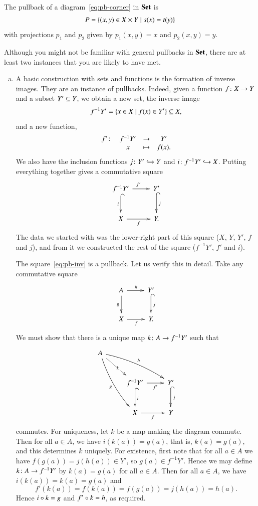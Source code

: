 \begin{examples}
\label{egs:pb-sets}
The pullback of a diagram~\eqref{eq:pb-corner} in $\mathbf{Set}$ is
\[
P = \{ (x, y) \in X \times Y \mathrel{|} s(x) = t(y) \}
\]
with projections $p_1$ and $p_2$ given by $p_1(x, y) = x$ and $p_2(x, y) =
y$.

Although you might not be familiar with general pullbacks in $\mathbf{Set}$, there are
at least two instances that you are likely to have met.
%
\begin{enumerate}[(b)]
\item
\label{eg:pb-sets-inv}
A basic construction with sets and functions is the formation of inverse%
%
%
images.  They are an instance of pullbacks.  Indeed, given a function
$f\from X \to Y$ and a subset $Y' \subseteq Y$, we obtain a new set, the inverse
image
\[
f^{-1}Y'
=
\{ x \in X \mathrel{|} f(x) \in Y' \} \subseteq X,
\]
and a new function,
\[
\begin{array}{cccc}
f'\from         &f^{-1} Y'      &\to            &Y'     \\
                &x              &\mapsto        &f(x).
\end{array}
\]
We also have the inclusion functions $j\from Y' \incl Y$ and $i\from f^{-1}Y'
\incl X$.  Putting everything together gives a commutative square
%
\begin{equation}
\label{eq:pb-inv}
\begin{array}{c}
\xymatrix@M+.5ex{
f^{-1}Y' \ar[r]^{f'} \ar@{^{(}->}[d]_i &
Y' \ar@{^{(}->}[d]^j   \\
X \ar[r]_f      &
Y.
}
\end{array}
\end{equation}
%
The data we started with was the lower-right part of this square ($X$, $Y$,
$Y'$, $f$ and $j$), and from it we constructed the rest of the square
($f^{-1} Y'$, $f'$ and $i$).

The square~\eqref{eq:pb-inv} is a pullback.  Let us verify this in detail.
Take any commutative square
\[
\xymatrix@M+.5ex{
A \ar[r]^h \ar[d]_g     &
Y' \ar@{^{(}->}[d]^j   \\
X \ar[r]_f      &
Y.
}
\]
We must show that there is a unique map $k\from A \to f^{-1}Y'$ such that
\[
\xymatrix@M+.5ex{
A \ar@/^/[rrd]^h \ar@{.>}[rd]|k \ar@/_/[rdd]_g  &       &       \\
                                        &
f^{-1}Y' \ar[r]_-{f'} \ar@{^{(}->}[d]^-i       &
Y' \ar@{^{(}->}[d]^j   \\
        &
X \ar[r]_f      &Y
}
\]
commutes.  For uniqueness, let $k$ be a map making the diagram commute.
Then for all $a \in A$, we have $i(k(a)) = g(a)$, that is, $k(a) = g(a)$,
and this determines $k$ uniquely.  For existence, first note that for all
$a \in A$ we have $f(g(a)) = j(h(a)) \in Y'$, so $g(a) \in f^{-1}Y'$.
Hence we may define $k\from A \to f^{-1} Y'$ by $k(a) = g(a)$ for all $a
\in A$.  Then for all $a \in A$, we have $i(k(a)) = k(a) = g(a)$ and
\[
f'(k(a)) = f(k(a)) = f(g(a)) = j(h(a)) = h(a).
\]
Hence $i \mathbin{\circ} k = g$ and $f' \mathbin{\circ} k = h$, as required.


\end{enumerate}
\end{examples}
